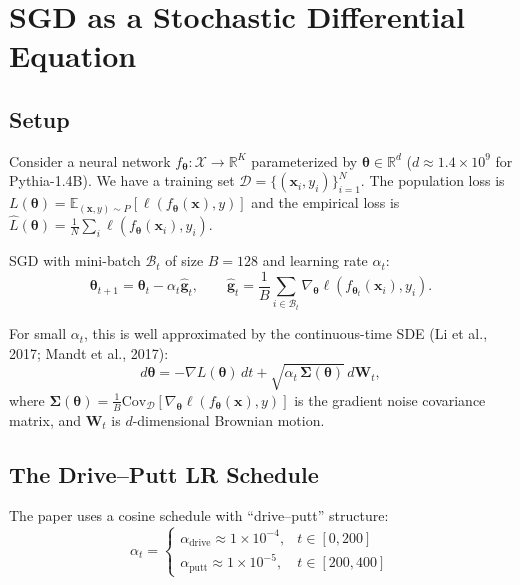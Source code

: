 \documentclass{article}
\newcommand{\btheta}{\boldsymbol{\theta}}
\newcommand{\bSigma}{\boldsymbol{\Sigma}}
\newcommand{\R}{\mathbb{R}}
\newcommand{\E}{\mathbb{E}}
\begin{document}
\section{SGD as a Stochastic Differential Equation}

\subsection{Setup}

Consider a neural network $f_\btheta: \mathcal{X} \to \R^K$ parameterized by
$\btheta \in \R^d$ ($d \approx 1.4 \times 10^9$ for Pythia-1.4B).  We have
a training set $\mathcal{D} = \{(\mathbf{x}_i, y_i)\}_{i=1}^N$.  The
population loss is $L(\btheta) = \E_{(\mathbf{x},y) \sim P}[\ell(f_\btheta(\mathbf{x}), y)]$
and the empirical loss is $\hat{L}(\btheta) = \frac{1}{N}\sum_i \ell(f_\btheta(\mathbf{x}_i), y_i)$.

SGD with mini-batch $\mathcal{B}_t$ of size $B=128$ and learning rate $\alpha_t$:
\begin{equation}
\btheta_{t+1} = \btheta_t - \alpha_t \hat{\mathbf{g}}_t, \qquad
\hat{\mathbf{g}}_t = \frac{1}{B}\sum_{i \in \mathcal{B}_t} \nabla_\btheta \ell(f_{\btheta_t}(\mathbf{x}_i), y_i).
\end{equation}

For small $\alpha_t$, this is well approximated by the continuous-time SDE (Li et al., 2017;
Mandt et al., 2017):
\begin{equation}
d\btheta = -\nabla L(\btheta)\,dt + \sqrt{\alpha_t\,\bSigma(\btheta)}\,d\mathbf{W}_t,
\label{eq:sde}
\end{equation}
where $\bSigma(\btheta) = \frac{1}{B}\mathrm{Cov}_{\mathcal{D}}[\nabla_\btheta \ell(f_\btheta(\mathbf{x}), y)]$
is the gradient noise covariance matrix, and $\mathbf{W}_t$ is $d$-dimensional Brownian motion.

\subsection{The Drive--Putt LR Schedule}

The paper uses a cosine schedule with ``drive--putt'' structure:
\begin{equation}
\alpha_t = \begin{cases}
\alpha_{\text{drive}} \approx 1 \times 10^{-4}, & t \in [0, 200] \\
\alpha_{\text{putt}} \approx 1 \times 10^{-5},  & t \in [200, 400]
\end{cases}
\end{equation}
\end{document}

